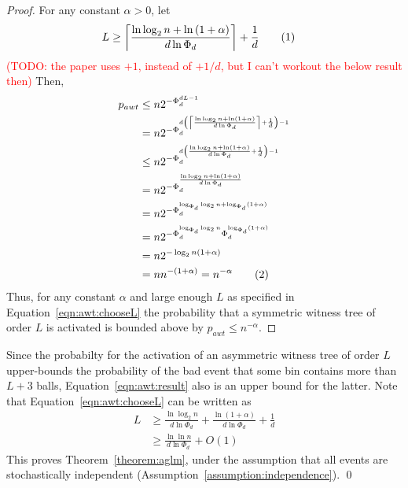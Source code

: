 \documentclass[a4paper,12pt]{article}
\newcommand\todo[1]{\textcolor{red}{(TODO: #1)}}
\newcommand\numberthis{\addtocounter{equation}{1}\tag{\theequation}}
\newcommand\neqn[1]{\numberthis\label{eqn:#1}}
\begin{document}
\begin{proof}
For any constant $\alpha > 0$, let 
\begin{align*}
L &\geq \left\lceil{\frac{\ln\log_2 n + \ln\left(1+\alpha\right)}{d \ln \Phi_d}}\right\rceil+\frac{1}{d} \neqn{awt:chooseL}
\end{align*}
\todo{the paper uses $+1$, instead of $+1/d$, but I can't workout the below result then} 
Then, 
\begin{align*}
p_{awt} &\leq n  2^{-\Phi_d^{d L -1}} \\
        &= n  2^{-\Phi_d^{d \left(\left\lceil{\frac{\ln\log_2 n + \ln\left(1+\alpha\right)}{d \ln \Phi_d}}\right\rceil+\frac{1}{d}\right) -1}} \\
        &\leq n  2^{-\Phi_d^{d \left({\frac{\ln\log_2 n + \ln\left(1+\alpha\right)}{d \ln \Phi_d}}+\frac{1}{d}\right) -1}} \\
        &= n  2^{-\Phi_d^{{\frac{\ln\log_2 n + \ln\left(1+\alpha\right)}{d \ln \Phi_d}}}} \\
        &= n  2^{-\Phi_d^{\log_{\Phi_d}\log_2 n + \log_{\Phi_d}\left(1+\alpha\right)}} \\
         &= n  2^{-\Phi_d^{\log_{\Phi_d}\log_2 n} \Phi_d^{ \log_{\Phi_d}\left(1+\alpha\right)}} \\
         &= n  2^{-\log_2 n \left(1+\alpha\right)} \\
         &= n  n ^{-(1+\alpha)} = n^{-\alpha} \neqn{awt:result}
\end{align*}
Thus, for any constant $\alpha$ and large enough $L$ as specified in Equation~\ref{eqn:awt:chooseL} the probability that a symmetric witness tree of order $L$ is activated is bounded above by $p_{awt }\leq n^{-\alpha}$.
\end{proof}

Since the probabilty for the activation of an asymmetric witness tree of order $L$ upper-bounds the probability of the bad event that some bin contains more than $L+3$ balls, Equation~\ref{eqn:awt:result} also is an upper bound for the latter. Note that Equation~\ref{eqn:awt:chooseL} can be written as
\begin{align*}
L &\geq \frac{\ln\log_2 n}{d \ln \Phi_d} + \frac{\ln\left(1+\alpha\right)}{d \ln \Phi_d} + \frac{1}{d}\\
  &\geq \frac{\ln\ln n}{d \ln \Phi_d} + O\left(1\right)
\end{align*}
This proves Theorem~\ref{theorem:aglm}, under the assumption that all events are stochastically independent (Assumption~\ref{assumption:independence}). \qed
\end{document}
